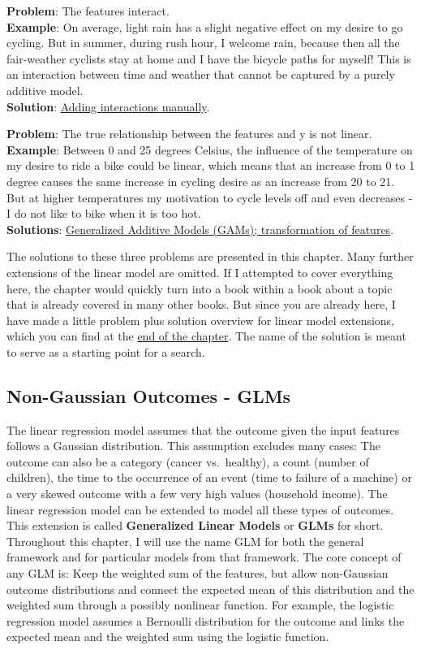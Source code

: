 \documentclass[
  11pt,
]{scrbook}
\begin{document}
\textbf{Problem}: The features interact.\\
\textbf{Example}: On average, light rain has a slight negative effect on my desire to go cycling.
But in summer, during rush hour, I welcome rain, because then all the fair-weather cyclists stay at home and I have the bicycle paths for myself!
This is an interaction between time and weather that cannot be captured by a purely additive model.\\
\textbf{Solution}: \protect\hyperlink{lm-interact}{Adding interactions manually}.

\textbf{Problem}: The true relationship between the features and y is not linear.\\
\textbf{Example}: Between 0 and 25 degrees Celsius, the influence of the temperature on my desire to ride a bike could be linear, which means that an increase from 0 to 1 degree causes the same increase in cycling desire as an increase from 20 to 21.
But at higher temperatures my motivation to cycle levels off and even decreases - I do not like to bike when it is too hot.\\
\textbf{Solutions}: \protect\hyperlink{gam}{Generalized Additive Models (GAMs); transformation of features}.

The solutions to these three problems are presented in this chapter.
Many further extensions of the linear model are omitted.
If I attempted to cover everything here, the chapter would quickly turn into a book within a book about a topic that is already covered in many other books.
But since you are already here, I have made a little problem plus solution overview for linear model extensions, which you can find at the \protect\hyperlink{more-lm-extension}{end of the chapter}.
The name of the solution is meant to serve as a starting point for a search.

\hypertarget{glm}{%
\subsection{Non-Gaussian Outcomes - GLMs}\label{glm}}

The linear regression model assumes that the outcome given the input features follows a Gaussian distribution.
This assumption excludes many cases:
The outcome can also be a category (cancer vs.~healthy), a count (number of children), the time to the occurrence of an event (time to failure of a machine) or a very skewed outcome with a few very high values (household income).
The linear regression model can be extended to model all these types of outcomes.
This extension is called \textbf{Generalized Linear Models} or \textbf{GLMs} for short.
Throughout this chapter, I will use the name GLM for both the general framework and for particular models from that framework.
The core concept of any GLM is:
Keep the weighted sum of the features, but allow non-Gaussian outcome distributions and connect the expected mean of this distribution and the weighted sum through a possibly nonlinear function.
For example, the logistic regression model assumes a Bernoulli distribution for the outcome and links the expected mean and the weighted sum using the logistic function.
\end{document}
